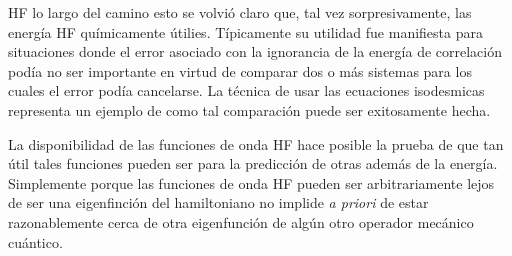 HF lo largo del camino esto se volvi\'o claro que, tal vez 
sorpresivamente,  las energ\'ia HF qu\'imicamente \'utilies. 
T\'ipicamente su utilidad fue manifiesta para situaciones donde el 
error asociado con la ignorancia de la energ\'ia de correlaci\'on 
pod\'ia no ser importante en virtud de comparar dos o m\'as sistemas
para los cuales el error pod\'ia cancelarse. La t\'ecnica de usar las
ecuaciones isodesmicas representa un ejemplo de como tal 
comparaci\'on puede ser exitosamente hecha.

La disponibilidad de las funciones de onda HF hace posible la prueba
de que tan \'util tales funciones pueden ser para la predicci\'on de 
otras adem\'as de la energ\'ia. Simplemente porque las funciones de 
onda HF pueden ser arbitrariamente lejos de ser una eigenfinci\'on 
del hamiltoniano no implide {\it a priori} de estar razonablemente
cerca de otra eigenfunci\'on de alg\'un otro operador mec\'anico 
cu\'antico.
